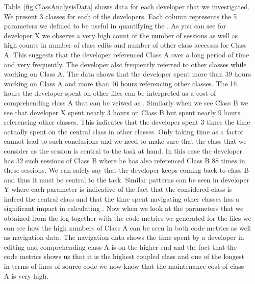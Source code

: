 Table~\ref{fig:ClassAnalysisData} shows data for each developer that we investigated. We present 3 classes for each of the developers. Each column represents the 5 parameters we defined to be useful in quantifying the \TD. As you can see for developer X we observe a very high count of the number of sessions as well as high counts in number of class edits and number of other class accesses for Class A. This suggests that the developer referenced Class A over a long period of time and very frequently. The developer also frequently referred to other classes while working on Class A. The data shows that the developer spent more than 39 hours working on Class A and more than 16 hours referencing other classes. The 16 hours the developer spent on other files can be interpreted as a cost of comprehending class A that can be veiwed as  \TD. Similarly when we see Class B we see that developer X spent nearly 3 hours on Class B but spent nearly 9 hours referencing other classes. This indicates that the developer spent 3 times the time actually spent on the central class in other classes. Only taking time as a factor cannot lead to such conclusions and we need to make sure that the class that we consider as the session is central to the task at hand. In this case the developer has 32 such sessions of Class B where he has also referenced Class B 88 times in these sessions. We can safely say that the developer keeps coming back to class B and thus it must be central to the task. Similar patterns can be seen in developer Y where each parameter is indicative of the fact that the considered class is indeed the central class and that the time spent navigating other classes has a significant impact in calculating \TD. Now when we look at the parameters that we obtained from the log together with the code metrics we generated for the files we can see how the high numbers of Class A can be seen in both code metrics as well as navigation data. The navigation data shows the time spent by a developer in editing and comprehending class A is on the higher end and the fact that the code metrics shows us that it is the highest coupled class and one of the longest in terms of lines of source code we now know that the maintenance cost of class A is very high. 
